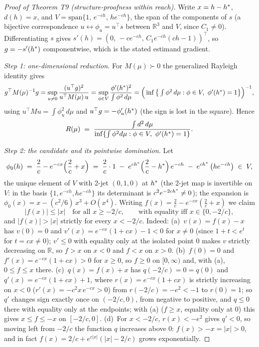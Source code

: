 \documentclass[11pt]{article}
\begin{document}
\begin{proof}[Proof of Theorem T9 (structure-proofness within reach)]
Write $x = h - h^{*}$, $d(h) = x$, and
$V = \mathrm{span}\{1,\, e^{-ch},\, h e^{-ch}\}$, the span of the
components of $s$ (a bijective correspondence $u \leftrightarrow
\phi_u = u^\top s$ between $\mathbb{R}^3$ and $V$, since $C_1 \neq 0$).
Differentiating $s$ gives
$s'(h) = (0,\, -c e^{-ch},\, C_1 e^{-ch}(ch - 1))^\top$, so
$g = -s'(h^{*})$ componentwise, which is the stated estimand gradient.

\emph{Step 1: one-dimensional reduction.} For $M(\mu) \succ 0$ the
generalized Rayleigh identity gives
\[
g^\top M(\mu)^{-1} g
 = \sup_{u \neq 0} \frac{(u^\top g)^2}{u^\top M(\mu)\, u}
 = \sup_{\phi \in V} \frac{\phi'(h^{*})^2}{\int \phi^2\, d\mu}
 = \Big(\inf\big\{ \textstyle\int \phi^2\, d\mu :
   \phi \in V,\ \phi'(h^{*}) = 1 \big\}\Big)^{-1},
\]
using $u^\top M u = \int \phi_u^2\, d\mu$ and $u^\top g =
-\phi_u'(h^{*})$ (the sign is lost in the square). Hence
\[
R(\mu) \;=\; \frac{\int d^2\, d\mu}
{\inf\{\int \phi^2 d\mu : \phi \in V,\ \phi'(h^{*}) = 1\}}.
\]

\emph{Step 2: the candidate and its pointwise domination.} Let
\[
\phi_0(h) \;=\; \frac{2}{c} - e^{-cx}\Big(\frac{2}{c} + x\Big)
 \;=\; \frac{2}{c}\cdot 1
 \;-\; e^{ch^{*}}\Big(\frac{2}{c} - h^{*}\Big)\, e^{-ch}
 \;-\; e^{ch^{*}}\, \big(h e^{-ch}\big) \;\in\; V,
\]
the unique element of $V$ with 2-jet $(0, 1, 0)$ at $h^{*}$ (the
2-jet map is invertible on $V$: in the basis $\{1, e^{-ch}, h e^{-ch}\}$
its determinant is $c^2 e^{-2ch^{*}} \neq 0$); the expansion is
$\phi_0(x) = x - (c^2/6)\,x^3 + O(x^4)$. Writing
$f(x) = \tfrac{2}{c} - e^{-cx}(\tfrac{2}{c} + x)$ we claim
\[
|f(x)| \le |x| \quad \text{for all } x \ge -2/c,
\qquad \text{with equality iff } x \in \{0, -2/c\},
\]
and $|f(x)| > |x|$ strictly for every $x < -2/c$. Indeed:
(a)~$v(x) = f(x) - x$ has $v(0) = 0$ and
$v'(x) = e^{-cx}(1 + cx) - 1 < 0$ for $x \neq 0$ (since $1 + t < e^t$
for $t = cx \neq 0$); $v' \le 0$ with equality only at the isolated
point $0$ makes $v$ strictly decreasing on $\mathbb{R}$, so $f > x$ on
$x < 0$ and $f < x$ on $x > 0$.
(b)~$f(0) = 0$ and $f'(x) = e^{-cx}(1 + cx) > 0$ for $x \ge 0$, so
$f \ge 0$ on $[0, \infty)$ and, with (a), $0 \le f \le x$ there.
(c)~$q(x) = f(x) + x$ has $q(-2/c) = 0 = q(0)$ and
$q'(x) = e^{-cx}(1 + cx) + 1$, where $r(x) = e^{-cx}(1 + cx)$ is
strictly increasing on $x < 0$ ($r'(x) = -c^2 x\, e^{-cx} > 0$) from
$r(-2/c) = -e^2 < -1$ to $r(0) = 1$; so $q'$ changes sign exactly once
on $(-2/c, 0)$, from negative to positive, and $q \le 0$ there with
equality only at the endpoints; with (a) ($f \ge x$, equality only at
$0$) this gives $x \le f \le -x$ on $[-2/c, 0]$.
(d)~For $x < -2/c$, $r(x) < -e^2$ gives $q' < 0$, so moving left from
$-2/c$ the function $q$ increases above $0$: $f(x) > -x = |x| > 0$,
and in fact $f(x) = 2/c + e^{c|x|}(|x| - 2/c)$ grows exponentially.


\end{proof}
\end{document}
